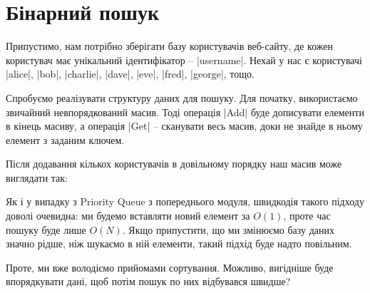\documentclass[12pt,a4paper]{report}
\begin{document}
\section {Бінарний пошук}

Припустимо, нам потрібно зберігати базу користувачів веб-сайту, де кожен користувач має унікальний ідентифікатор -- |username|. Нехай у нас є користувачі |alice|, |bob|, |charlie|, |dave|, |eve|, |fred|, |george|, тощо.

Спробуємо реалізувати структуру даних для пошуку. Для початку, використаємо звичайний невпорядкований масив. Тоді операція |Add| буде дописувати елементи в кінець масиву, а операція |Get| -- сканувати весь масив, доки не знайде в ньому елемент з заданим ключем.

Після додавання кількох користувачів в довільному порядку наш масив може виглядати так:

\begin{center}
\end{center}

Як і у випадку з Priority Queue з попереднього модуля, швидкодія такого підходу доволі очевидна: ми будемо вставляти новий елемент за \(O(1)\), проте час пошуку буде лише \(O(N)\). Якщо припустити, що ми змінюємо базу даних значно рідше, ніж шукаємо в ній елементи, такий підхід буде надто повільним.

Проте, ми вже володіємо прийомами сортування. Можливо, вигідніше буде впорядкувати дані, щоб потім пошук по них відбувався швидше?

\begin{center}
\end{center}
\end{document}
